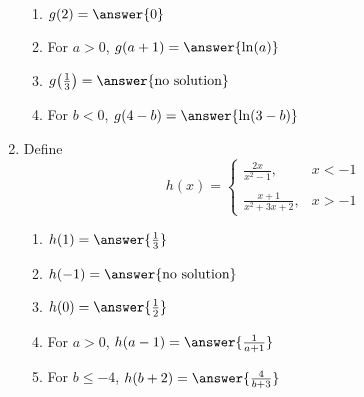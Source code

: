 \documentclass{ximera}
\begin{document}
\begin{exercise}
\begin{enumerate}
\begin{enumerate}
\item $g(2) = \answer{0}$

\item For $a>0$, $g(a+1) = \answer{\ln(a)}$

\item $g\!\left(\frac{1}{3}\right) = \answer{\text{no solution}}$


\item For $b<0$, $g(4-b) = \answer{\ln(3-b)}$

\end{enumerate}

\item Define \begin{equation*}
	h(x) = \begin{cases}
		\frac{2x}{x^2-1},  & x < -1 \\
		\\
		\frac{x+1}{x^2+3x+2},  & x> -1 
		\end{cases}
		\end{equation*}
	\begin{enumerate}
	\item $h(1) = \answer{\frac{1}{3}}$
	
	\item $h(-1) = \answer{\text{no solution}}$
	
	\item $h(0) = \answer{\frac{1}{2}}$
	
	\item For $a>0$, $h(a-1) = \answer{\frac{1}{a+1}}$
	
	\item For $b \leq -4$, $h(b+2) = \answer{\frac{4}{b+3}}$
	\end{enumerate}
\end{enumerate}

\end{exercise}
\end{document}
